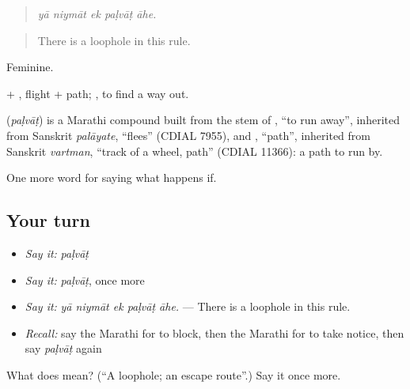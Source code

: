 \begin{quote}
\emph{yā niymāt ek paḷvāṭ āhe.}
\end{quote}

\begin{quote}
There is a loophole in this rule.
\end{quote}

Feminine.

 + , flight + path;  , to find a way out.

\begin{cousinweb}
\textbf{} (\emph{paḷvāṭ}) is a Marathi compound built from the stem of , \textquotedblleft{}to run away\textquotedblright{}, inherited from Sanskrit \emph{palāyate}, \textquotedblleft{}flees\textquotedblright{} (CDIAL 7955), and , \textquotedblleft{}path\textquotedblright{}, inherited from Sanskrit \emph{vartman}, \textquotedblleft{}track of a wheel, path\textquotedblright{} (CDIAL 11366): a path to run by.
\end{cousinweb}

\begin{grammarlens}[title={What you've built}]
One more word for saying what happens if.
\end{grammarlens}

\subsection*{Your turn}
\begin{itemize}
\raggedright
  \item \emph{Say it:} \emph{paḷvāṭ}
  \item \emph{Say it:} \emph{paḷvāṭ}, once more
  \item \emph{Say it:} \emph{yā niymāt ek paḷvāṭ āhe.} — There is a loophole in this rule.
  \item \emph{Recall:} say the Marathi for to block, then the Marathi for to take notice, then say \emph{paḷvāṭ} again
\end{itemize}

\begin{tcolorbox}[breakable,colback=teal!4,colframe=teal!35!black,title={Before you move on}]
What does  mean? (\textquotedblleft{}A loophole; an escape route\textquotedblright{}.) Say it once more.
\end{tcolorbox}
